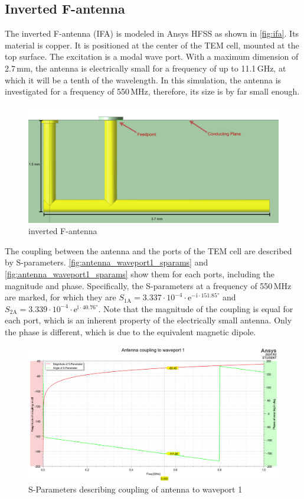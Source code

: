 \subsection{Inverted F-antenna}\label{sec:ifa_sim}

The inverted F-antenna (IFA) is modeled in Ansys HFSS as shown in \autoref{fig:ifa}. Its material is copper. It is positioned at the center of the TEM cell, mounted at the top surface. The excitation is a modal wave port. With a maximum dimension of 2.7\,mm, the antenna is electrically small for a frequency of up to 11.1\,GHz, at which it will be a tenth of the wavelength. In this simulation, the antenna is investigated for a frequency of 550\,MHz, therefore, its size is by far small enough.

\begin{figure}[h]
    \centering
    \includegraphics[width=0.7\linewidth]{Documentation//content//30_simulations//img/ifa.png}
    \caption{inverted F-antenna}
    \label{fig:ifa}
\end{figure}

The coupling between the antenna and the ports of the TEM cell are described by S-parameters. \autoref{fig:antenna_waveport1_sparams} and \autoref{fig:antenna_waveport1_sparams} show them for each ports, including the magnitude and phase. Specifically, the S-parameters at a frequency of 550\,MHz are marked, for which they are $S_{1\mathrm{A}}=3.337\cdot10^{-4}\cdot \mathrm{e}^{-\mathrm{i}\cdot151.85°}$ and $S_{2\mathrm{A}}=3.339\cdot10^{-4}\cdot \mathrm{e}^{\mathrm{i}\cdot40.76°}$. Note that the magnitude of the coupling is equal for each port, which is an inherent property of the electrically small antenna. Only the phase is different, which is due to the equivalent magnetic dipole.
 

\begin{figure}[h]
    \centering
    \includegraphics[width=1\linewidth]{Documentation//content//30_simulations//img/antenna_waveport1_sparams.png}
    \caption{S-Parameters describing coupling of antenna to waveport 1}
    \label{fig:antenna_waveport1_sparams}
\end{figure}

